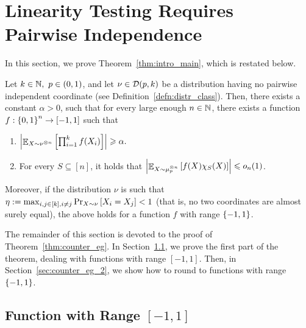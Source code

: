 \section{Linearity Testing Requires Pairwise Independence}\label{sec:lin_test_failure}

In this section, we prove Theorem~\ref{thm:intro_main}, which is restated below.

\begin{theorem}\label{thm:counter_eg}
	Let $k\in \mathbb{N},\ p\in (0,1)$, and let $\nu \in \mathcal D(p,k)$ be a distribution having no pairwise independent coordinate (see Definition~\ref{defn:distr_class}).
	Then, there exists a constant $\alpha>0$, such that for every large enough $n\in \mathbb{N}$, there exists a function $f:\left\{ 0,1 \right\}^n \to [-1,1]$ such that 
	\begin{enumerate}
		\item $\left|\mathop{\mathbb{E}}_{X\sim \nu^{\otimes n}} \left[ \prod_{i=1}^k f(X_i) \right] \right|\geqslant \alpha.$
		\item For every $S\subseteq [n]$, it holds that $ \left|\mathop{\mathbb{E}}_{X\sim \mu_p^{\otimes n}}\left[ f(X)\chi_S(X) \right]\right| \leqslant o_n(1)$.
	\end{enumerate}
	
	Moreover, if the distribution $\nu$ is such that $\eta:= \max_{i,j\in [k], i\not= j} \Pr_{X\sim \nu}\left[ X_i=X_j \right] < 1$ (that is, no two coordinates are almost surely equal), the above holds for a function $f$ with range $\left\{ -1,1 \right\}$.
\end{theorem}

The remainder of this section is devoted to the proof of Theorem~\ref{thm:counter_eg}.
In Section~\ref{sec:counter_eg_1}, we prove the first part of the theorem, dealing with functions with range $[-1,1]$.
Then, in Section~\ref{sec:counter_eg_2}, we show how to round to functions with range $\left\{ -1,1 \right\}$.


\subsection{Function with Range $[-1,1]$}\label{sec:counter_eg_1}

